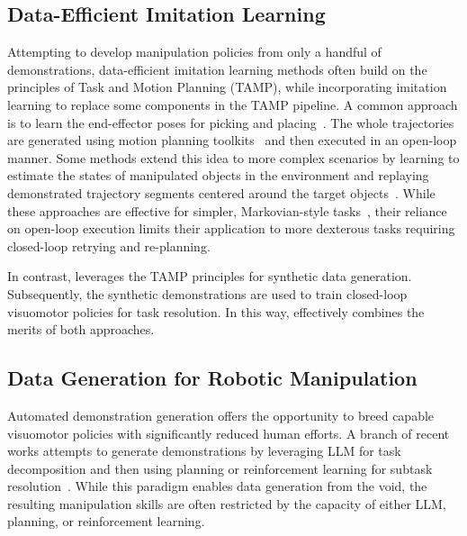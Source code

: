 \subsection{Data-Efficient Imitation Learning}
Attempting to develop manipulation policies from only a handful of demonstrations, data-efficient imitation learning methods often build on the principles of Task and Motion Planning (TAMP), while incorporating imitation learning to replace some components in the TAMP pipeline.
A common approach is to learn the end-effector poses for picking and placing~\cite{zeng2021transporter,simeonov2022neural,wen2022you,xue2023useek,gao2024riemann}. The whole trajectories are generated using motion planning toolkits~\cite{kuffner2000rrt} and then executed in an open-loop manner. 
Some methods extend this idea to more complex scenarios by learning to estimate the states of manipulated objects in the environment and replaying demonstrated trajectory segments centered around the target objects~\cite{johns2021coarse,valassakis2022demonstrate,di2022learning,di2024dinobot}.
While these approaches are effective for simpler, Markovian-style tasks~\cite{vosylius2024instant}, their reliance on open-loop execution limits their application to more dexterous tasks requiring closed-loop retrying and re-planning.



In contrast, \method leverages the TAMP principles for synthetic data generation. Subsequently, the synthetic demonstrations are used to train closed-loop visuomotor policies for task resolution. In this way, \method effectively combines the merits of both approaches.









\subsection{Data Generation for Robotic Manipulation}
Automated demonstration generation offers the opportunity to breed capable visuomotor policies with significantly reduced human efforts. A branch of recent works attempts to generate demonstrations by leveraging LLM for task decomposition and then using planning or reinforcement learning for subtask resolution~\cite{wang2023gensim,hua2024gensim2,wang2023robogen}. While this paradigm enables data generation from the void, the resulting manipulation skills are often restricted by the capacity of either LLM, planning, or reinforcement learning.

